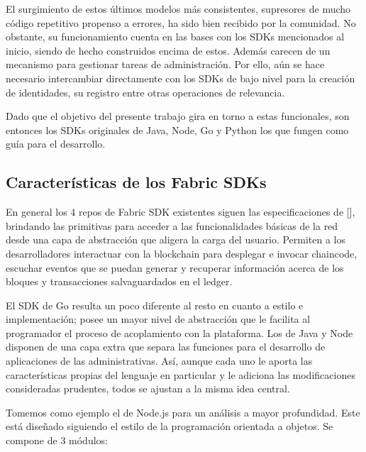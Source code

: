 El surgimiento de estos \'ultimos modelos m\'as consistentes, supresores de mucho c\'odigo repetitivo propenso a errores, ha sido bien recibido por la comunidad. No obstante, su funcionamiento cuenta en las bases con los SDKs mencionados al inicio, siendo de hecho construidos encima de estos. Adem\'as carecen de un mecanismo para gestionar tareas de administraci\'on. Por ello, a\'un se hace necesario intercambiar directamente con los SDKs de bajo nivel para la creaci\'on de identidades, su registro entre otras operaciones de relevancia.

Dado que el objetivo del presente trabajo gira en torno a estas funcionales, son entonces los SDKs originales de Java, Node, Go y Python los que fungen como gu\'ia para el desarrollo.

\subsection{Caracter\'isticas de los Fabric SDKs}

En general los 4 repos de Fabric SDK existentes siguen las especificaciones de [\cite{fabricsdkspec}], brindando las primitivas para acceder a las funcionalidades b\'asicas de la red desde una capa de abstracci\'on que aligera la carga del usuario. Permiten a los desarrolladores interactuar con la blockchain para desplegar e invocar chaincode, escuchar eventos que se puedan generar y recuperar informaci\'on acerca de los bloques y transacciones salvaguardados en el ledger. 

El SDK de Go resulta un poco diferente al resto en cuanto a estilo e implementaci\'on; posee un mayor nivel de abstracci\'on que le facilita al programador el proceso de acoplamiento con la plataforma. Los de Java y Node disponen de una capa extra que separa las funciones para el desarrollo de aplicaciones de las administrativas. As\'i, aunque cada uno le aporta las caracter\'isticas propias del lenguaje en particular y le adiciona las modificaciones consideradas prudentes, todos se ajustan a la misma idea central.


Tomemos como ejemplo el de Node.js para un an\'alisis a mayor profundidad. Este est\'a dise\~nado siguiendo el estilo de la programaci\'on orientada a objetos. Se compone de 3 m\'odulos:

